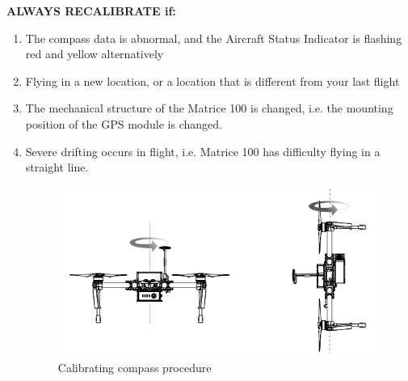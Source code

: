 \textbf{ALWAYS RECALIBRATE if:}
\begin{enumerate}
\setlength{\itemsep}{0em}
\setlength{\parskip}{0em}
\item The compass data is abnormal, and the Aircraft Status Indicator is flashing red and yellow alternatively 
\item Flying in a new location, or a location that is different from your last flight
\item The mechanical structure of the Matrice 100 is changed, i.e. the mounting position of the GPS module is changed. 
\item Severe drifting occurs in flight, i.e. Matrice 100 has difficulty flying in a straight line. 
\begin{figure}[h]
\begin{center}
\includegraphics[width=\columnwidth]{figures/op4.png}
\end{center}
\caption{Calibrating compass procedure}
\end{figure}  
\end{enumerate}

  
\clearpage
